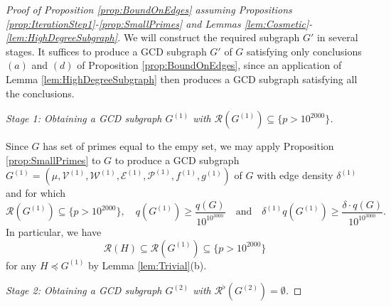 \documentclass[12pt]{amsart}
\numberwithin{equation}{section}
\theoremstyle{definition}
\theoremstyle{remark}
\newcommand{\CE}{\mathcal{E}}
\newcommand{\CP}{\mathcal{P}}
\newcommand{\CR}{\mathcal{R}}
\newcommand{\CV}{\mathcal{V}}
\newcommand{\CW}{\mathcal{W}}
\renewcommand{\ge}{\geqslant}
\begin{document}
\begin{proof}[Proof of Proposition \ref{prop:BoundOnEdges} assuming Propositions \ref{prop:IterationStep1}-\ref{prop:SmallPrimes} and Lemmas \ref{lem:Cosmetic}-\ref{lem:HighDegreeSubgraph}] We will construct the required subgraph $G'$ in several stages. It suffices to produce a GCD subgraph $G'$ of $G$ satisfying only conclusions $(a)$ and $(d)$ of Proposition \ref{prop:BoundOnEdges}, since an application of Lemma \ref{lem:HighDegreeSubgraph} then produces a GCD subgraph satisfying all the conclusions.

\medskip

\noindent
\textit{Stage 1: Obtaining a GCD subgraph $G^{(1)}$ with $\CR(G^{(1)})\subseteq \{p> 10^{2000}\}$.}

\medskip


Since $G$ has set of primes equal to the empy set, we may apply Proposition \ref{prop:SmallPrimes} to $G$ to produce a GCD subgraph $G^{(1)}=(\mu,\CV^{(1)},\CW^{(1)},\CE^{(1)},\CP^{(1)},f^{(1)},g^{(1)})$ of $G$ with edge density $\delta^{(1)}$ and for which
\begin{equation}
\CR(G^{(1)})\subseteq\{p>10^{2000}\},
\quad q(G^{(1)})\ge\frac{q(G)}{10^{10^{3000}}}
\quad\text{and}\quad 
\delta^{(1)}q(G^{(1)})\ge \frac{\delta\cdot q(G)}{10^{10^{3000}}}.
\label{eq:G1Quality}
\end{equation}
In particular, we have
\begin{equation}\label{eq:R of subgraphs}
\CR(H)\subseteq \CR(G^{(1)})\subseteq \{p>10^{2000}\}
\end{equation}
for any $H\preceq G^{(1)}$ by Lemma \ref{lem:Trivial}(b).

\bigskip


\noindent
{\it Stage 2: Obtaining a GCD subgraph $G^{(2)}$ with $\CR^\flat(G^{(2)})=\emptyset$.}

\medskip





\end{proof}
\end{document}
